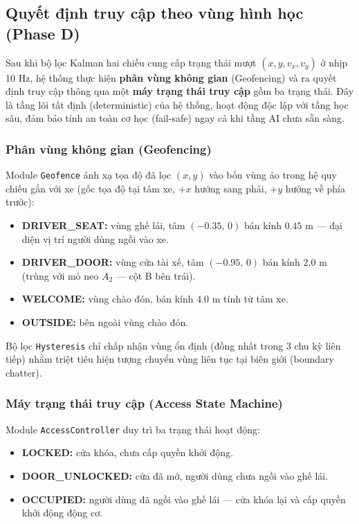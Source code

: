 \subsection{Quyết định truy cập theo vùng hình học (Phase D)}

Sau khi bộ lọc Kalman hai chiều cung cấp trạng thái mượt $(x, y, v_x, v_y)$ ở nhịp 10 Hz, hệ thống thực hiện \textbf{phân vùng không gian} (Geofencing) và ra quyết định truy cập thông qua một \textbf{máy trạng thái truy cập} gồm ba trạng thái. Đây là tầng lõi tất định (deterministic) của hệ thống, hoạt động độc lập với tầng học sâu, đảm bảo tính an toàn cơ học (fail-safe) ngay cả khi tầng AI chưa sẵn sàng.

\subsubsection{Phân vùng không gian (Geofencing)}

Module \texttt{Geofence} ánh xạ tọa độ đã lọc $(x, y)$ vào bốn vùng ảo trong hệ quy chiếu gắn với xe (gốc tọa độ tại tâm xe, $+x$ hướng sang phải, $+y$ hướng về phía trước):

\begin{itemize}
    \item \textbf{DRIVER\_SEAT:} vùng ghế lái, tâm $(-0.35,\,0)$ bán kính $0.45$ m --- đại diện vị trí người dùng ngồi vào xe.
    \item \textbf{DRIVER\_DOOR:} vùng cửa tài xế, tâm $(-0.95,\,0)$ bán kính $2.0$ m (trùng với mỏ neo $A_2$ --- cột B bên trái).
    \item \textbf{WELCOME:} vùng chào đón, bán kính $4.0$ m tính từ tâm xe.
    \item \textbf{OUTSIDE:} bên ngoài vùng chào đón.
\end{itemize}

Bộ lọc \texttt{Hysteresis} chỉ chấp nhận vùng ổn định (đồng nhất trong 3 chu kỳ liên tiếp) nhằm triệt tiêu hiện tượng chuyển vùng liên tục tại biên giới (boundary chatter).

\subsubsection{Máy trạng thái truy cập (Access State Machine)}

Module \texttt{AccessController} duy trì ba trạng thái hoạt động:

\begin{itemize}
    \item \textbf{LOCKED:} cửa khóa, chưa cấp quyền khởi động.
    \item \textbf{DOOR\_UNLOCKED:} cửa đã mở, người dùng chưa ngồi vào ghế lái.
    \item \textbf{OCCUPIED:} người dùng đã ngồi vào ghế lái --- cửa khóa lại và cấp quyền khởi động động cơ.
\end{itemize}


